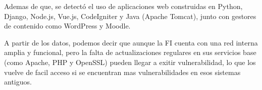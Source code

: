 \documentclass[letterpaper,11pt]{article}
\begin{document}
Ademas de que, se detectó el uso de 
aplicaciones web construidas en 
Python, Django, Node.js, Vue.js, CodeIgniter y Java (Apache Tomcat), 
junto con gestores de contenido como WordPress y Moodle.

A partir de los datos, 
podemos decir que aunque la FI cuenta con una red 
interna amplia y funcional, pero 
la falta de actualizaciones regulares 
en sus servicios base (como Apache, PHP y OpenSSL) 
pueden llegar a exitir vulnerabilidad, lo que los vuelve 
de facil acceso si se encuentran mas vulnerabilidades en esos sistemas antiguos. 


\nocite{*}
\printbibliography[heading=bibintoc, title={Referencias}]
\end{document}
